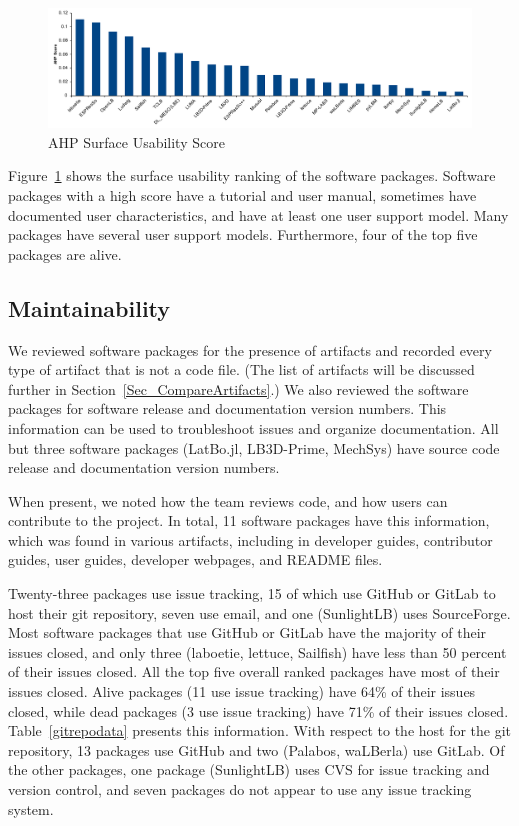 \documentclass[final, 3p, times, authoryear]{elsarticle}
\begin{document}
\begin{figure}[h!]
	\begin{center}
		\includegraphics[width=1.0\textwidth]{./figures/usability_chart.pdf}
		\caption{AHP Surface Usability Score}
		\label{Fig_Usability}
	\end{center}
\end{figure}

Figure~\ref{Fig_Usability} shows the surface usability ranking of the software
packages. Software packages with a high score have a tutorial and user manual,
sometimes have documented user characteristics, and have at least one user
support model. Many packages have several user support models. Furthermore, four
of the top five packages are alive. 

\subsection{Maintainability} \label{Sec_Maintainability}

We reviewed software packages for the presence of artifacts and recorded every
type of artifact that is not a code file. (The list of artifacts will be
discussed further in Section~\ref{Sec_CompareArtifacts}.)  We also reviewed the
software packages for software release and documentation version numbers. This
information can be used to troubleshoot issues and organize documentation. All
but three software packages (LatBo.jl, LB3D-Prime, MechSys) have source code
release and documentation version numbers.

When present, we noted how the team reviews code, and how users can contribute
to the project. In total, 11 software packages have this information, which was
found in various artifacts, including in developer guides, contributor guides,
user guides, developer webpages, and README files. 

Twenty-three packages use issue tracking, 15 of which use GitHub or GitLab to
host their git repository, seven use email, and one (SunlightLB) uses
SourceForge. Most software packages that use GitHub or GitLab have the majority
of their issues closed, and only three (laboetie, lettuce, Sailfish) have less
than 50 percent of their issues closed. All the top five overall ranked packages
have most of their issues closed. Alive packages (11 use issue tracking) have
64\% of their issues closed, while dead packages (3 use issue tracking) have
71\% of their issues closed. Table~\ref{gitrepodata} presents this information.
With respect to the host for the git repository, 13 packages use GitHub and two
(Palabos, waLBerla) use GitLab. Of the other packages, one package (SunlightLB)
uses CVS for issue tracking and version control, and seven packages do not
appear to use any issue tracking system.
\end{document}
